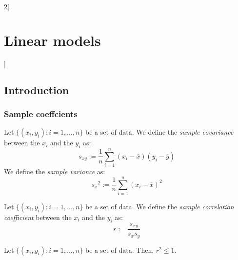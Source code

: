 \documentclass[../../../main_math.tex]{subfiles}
\begin{document}
\renewcommand{\col}{\sta}
\begin{multicols}{2}[\section{Linear models}]
  \subsection{Introduction}
  \subsubsection{Sample coeffcients}
  \begin{definition}
    Let $\{(x_i,y_i):i=1,\ldots,n\}$ be a set of data. We define the \emph{sample covariance} between the $x_i$ and the $y_i$ as: $$s_{xy}:=\frac{1}{n}\sum_{i=1}^n(x_i-\overline{x})(y_i-\overline{y})$$
    We define the \emph{sample variance} as: $${s_{x}}^2:=\frac{1}{n}\sum_{i=1}^n{(x_i-\overline{x})}^2$$
  \end{definition}
  \begin{definition}
    Let $\{(x_i,y_i):i=1,\ldots,n\}$ be a set of data. We define the \emph{sample correlation coefficient} between the $x_i$ and the $y_i$ as: $$r:=\frac{s_{xy}}{s_xs_y}$$
  \end{definition}
  \begin{proposition}
    Let $\{(x_i,y_i):i=1,\ldots,n\}$ be a set of data. Then, $r^2\leq 1$.
  \end{proposition}

\end{multicols}
\end{document}
